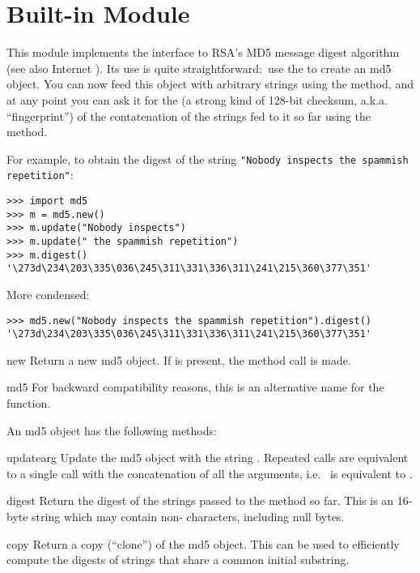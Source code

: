 \section{Built-in Module }
\label{module-md5}

This module implements the interface to RSA's MD5 message digest
algorithm (see also Internet ).  Its use is quite
straightforward:\ use the  to create an md5 object.
You can now feed this object with arbitrary strings using the
 method, and at any point you can ask it for the
 (a strong kind of 128-bit checksum,
a.k.a. ``fingerprint'') of the contatenation of the strings fed to it
so far using the  method.

For example, to obtain the digest of the string {\tt"Nobody inspects
the spammish repetition"}:

\begin{verbatim}
>>> import md5
>>> m = md5.new()
>>> m.update("Nobody inspects")
>>> m.update(" the spammish repetition")
>>> m.digest()
'\273d\234\203\335\036\245\311\331\336\311\241\215\360\377\351'
\end{verbatim}
%
More condensed:

\begin{verbatim}
>>> md5.new("Nobody inspects the spammish repetition").digest()
'\273d\234\203\335\036\245\311\331\336\311\241\215\360\377\351'
\end{verbatim}
%

\begin{funcdesc}{new}{}
Return a new md5 object.  If  is present, the method call
 is made.
\end{funcdesc}

\begin{funcdesc}{md5}{}
For backward compatibility reasons, this is an alternative name for the
 function.
\end{funcdesc}

An md5 object has the following methods:

\begin{funcdesc}{update}{arg}
Update the md5 object with the string .  Repeated calls are
equivalent to a single call with the concatenation of all the
arguments, i.e.\  is equivalent to
.
\end{funcdesc}

\begin{funcdesc}{digest}{}
Return the digest of the strings passed to the 
method so far.  This is an 16-byte string which may contain
non-\ASCII{} characters, including null bytes.
\end{funcdesc}

\begin{funcdesc}{copy}{}
Return a copy (``clone'') of the md5 object.  This can be used to
efficiently compute the digests of strings that share a common initial
substring.
\end{funcdesc}
